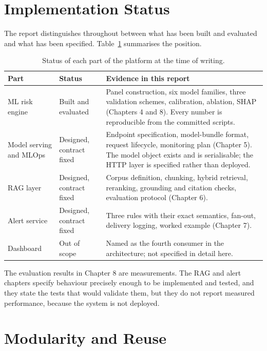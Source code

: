 \documentclass[10pt,openany]{report}
\begin{document}
\section{Implementation Status}

The report distinguishes throughout between what has been built and evaluated and what has been
specified. Table~\ref{tab:status} summarises the position.

\begin{table}[htbp]
\centering
\caption{Status of each part of the platform at the time of writing.}
\label{tab:status}
\small
\begin{tabular}{@{}>{\raggedright\arraybackslash}p{4.1cm}>{\raggedright\arraybackslash}p{2.5cm}>{\raggedright\arraybackslash}p{6.6cm}@{}}
\toprule
\textbf{Part} & \textbf{Status} & \textbf{Evidence in this report} \\
\midrule
ML risk engine & Built and evaluated & Panel construction, six model families, three validation schemes, calibration, ablation, SHAP (Chapters 4 and 8). Every number is reproducible from the committed scripts. \\
Model serving and MLOps & Designed, contract fixed & Endpoint specification, model-bundle format, request lifecycle, monitoring plan (Chapter 5). The model object exists and is serialisable; the HTTP layer is specified rather than deployed. \\
RAG layer & Designed, contract fixed & Corpus definition, chunking, hybrid retrieval, reranking, grounding and citation checks, evaluation protocol (Chapter 6). \\
Alert service & Designed, contract fixed & Three rules with their exact semantics, fan-out, delivery logging, worked example (Chapter 7). \\
Dashboard & Out of scope & Named as the fourth consumer in the architecture; not specified in detail here. \\
\bottomrule
\end{tabular}
\end{table}

The evaluation results in Chapter 8 are measurements. The RAG and alert chapters specify behaviour precisely enough to be
implemented and tested, and they state the tests that would validate them, but they do not report
measured performance, because the system is not deployed.

\section{Modularity and Reuse}
\end{document}
